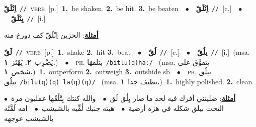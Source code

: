 \documentclass[10pt,a4paper,twoside]{article} %
\begin{document}
\begin{multicols}{2}
{\setlength\topsep{0pt}\textbf{\foreignlanguage{arabic}{اِنْلَقّ}}\ {\color{gray}\texttt{//}\color{black}}\ \textsc{verb}\ [p.]\ \textbf{1.}~be shaken.  \textbf{2.}~be hit.  \textbf{3.}~be beaten\ \ $\bullet$\ \ \setlength\topsep{0pt}\textbf{\foreignlanguage{arabic}{اِنْلَقّ}}\ {\color{gray}\texttt{//}\color{black}}\ [c.]\ \ $\bullet$\ \ \setlength\topsep{0pt}\textbf{\foreignlanguage{arabic}{يِنْلَقّ}}\ {\color{gray}\texttt{//}\color{black}}\ [i.]\  \begin{flushright}\color{gray}\foreignlanguage{arabic}{\textbf{\underline{\foreignlanguage{arabic}{أمثلة}}}: الحزين اِنْلَقّ كف دورخ منه}\end{flushright}\color{black}} \vspace{2mm}

{\setlength\topsep{0pt}\textbf{\foreignlanguage{arabic}{لَقّ}}\ {\color{gray}\texttt{//}\color{black}}\ \textsc{verb}\ [p.]\ \textbf{1.}~shake  \textbf{2.}~hit  \textbf{3.}~beat\ \ $\bullet$\ \ \setlength\topsep{0pt}\textbf{\foreignlanguage{arabic}{لُقّ}}\ {\color{gray}\texttt{//}\color{black}}\ [c.]\ \ $\bullet$\ \ \setlength\topsep{0pt}\textbf{\foreignlanguage{arabic}{يلُقّ}}\ {\color{gray}\texttt{//}\color{black}}\ [i.]\ \color{gray}(msa. \foreignlanguage{arabic}{يَضْرِب}~\foreignlanguage{arabic}{\textbf{٢.}}  \foreignlanguage{arabic}{يَهْتَز}~\foreignlanguage{arabic}{\textbf{١.}})\color{black}\ \ $\bullet$\ \ \textsc{ph.} \color{gray} \foreignlanguage{arabic}{بتلقهَا}\color{black}\ {\color{gray}\texttt{/{\sffamily bitlu(q)haː}/}\color{black}}\ \color{gray} (msa. \foreignlanguage{arabic}{يتفوَّق على شخص}~\foreignlanguage{arabic}{\textbf{١.}})\color{black}\ \textbf{1.}~outperform  \textbf{2.}~outweigh  \textbf{3.}~outshide sb\ \ $\bullet$\ \ \textsc{ph.} \color{gray} \foreignlanguage{arabic}{بيلُق بيلُق}\color{black}\ {\color{gray}\texttt{/{\sffamily bilu(q)(q) la(q)(q)}/}\color{black}}\ \color{gray} (msa. \foreignlanguage{arabic}{نظيف جدا}~\foreignlanguage{arabic}{\textbf{١.}})\color{black}\ \textbf{1.}~highly polished.  \textbf{2.}~clean\  \begin{flushright}\color{gray}\foreignlanguage{arabic}{\textbf{\underline{\foreignlanguage{arabic}{أمثلة}}}: ضليتني أفرك فيه لحد ما صار بِلُق لَق\ $\bullet$\ \  والله كنتك بِتْلُقْها عمليون مرة\ $\bullet$\ \  التخت بيلق شكله في هزة أرضية\ $\bullet$\ \  هيته جنبك لُقِّيه بالشبشب\ $\bullet$\ \  امه لَقَّتُه بالشبشب عوجهه}\end{flushright}\color{black}} \vspace{2mm}


\end{multicols}
\end{document}
